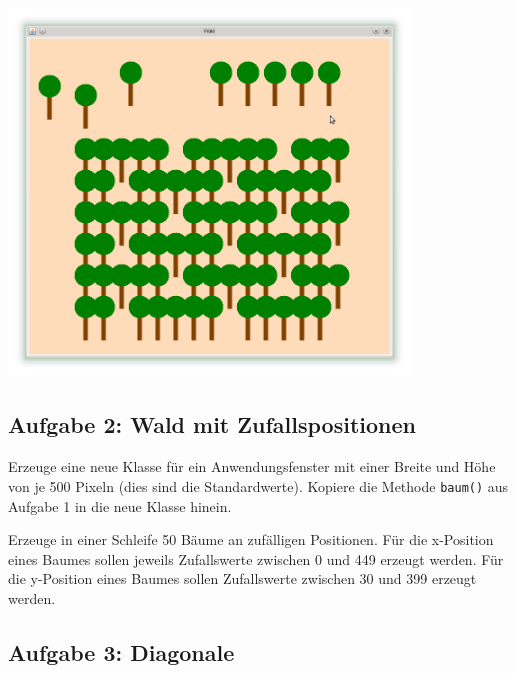 \begin{center}
\includegraphics[width=0.8\textwidth]{./inf/SEKII/09_Java_Farben_und_Zufall/Aufgabe1.png}
\end{center}


\subsection{Aufgabe 2: Wald mit Zufallspositionen}

\begin{compactenum}[a)]
\item Erzeuge eine neue Klasse für ein Anwendungsfenster mit einer Breite und
Höhe von je 500 Pixeln (dies sind die Standardwerte). Kopiere die Methode
\lstinline|baum()| aus Aufgabe 1 in die neue Klasse hinein.
\item Erzeuge in einer Schleife 50 Bäume an zufälligen Positionen. Für die
x-Position eines Baumes sollen jeweils Zufallswerte zwischen 0 und 449 erzeugt
werden. Für die y-Position eines Baumes sollen Zufallswerte zwischen 30 und 399
erzeugt werden.
\end{compactenum}


\subsection{Aufgabe 3: Diagonale}

